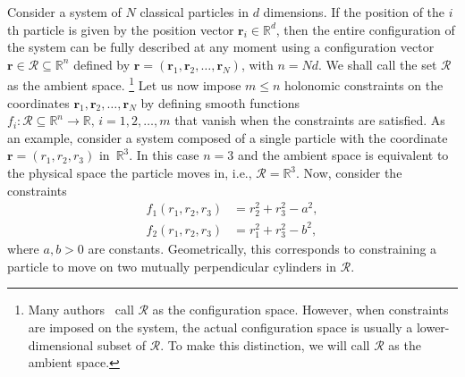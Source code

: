 Consider a system of $N$ classical particles in $d$ dimensions.  If the position of the $i$th particle is given by the position vector $\bm{r}_{i} \in \mathbb{R}^{d}$, then the entire configuration of the system can be fully described at any moment using a configuration vector $\bm{r} \in \mathscr{R} \subseteq \mathbb{R}^{n}$ defined by $\bm{r} = (\bm{r}_{1}, \bm{r}_{2}, \ldots, \bm{r}_{N})$, with $n = Nd$.
  We shall call the set $\mathscr{R}$ as the ambient space.%
  \footnote{Many authors~\cite{littlejohn1997,lelievre2010} call $\mathscr{R}$ as the configuration space.  However, when constraints are imposed on the system, the actual configuration space is usually a lower-dimensional subset of $\mathscr{R}$.  To make this distinction, we will call $\mathscr{R}$ as the ambient space.}
Let us now impose $m \leq n$ holonomic constraints on the coordinates $\bm{r}_1, \bm{r}_2, \dots, \bm{r}_N$ by defining smooth functions $f_i: \mathscr{R} \subseteq \mathbb{R}^n \to \mathbb{R},\, i=1, 2, \dots, m$ that vanish when the constraints are satisfied.
As an example, consider a system composed of a single particle with the coordinate $\bm{r} = (r_{1}, r_{2}, r_{3})$ in~$\mathbb{R}^3$.
In this case $n=3$ and the ambient space is equivalent to the physical space the particle moves in, i.e., $\mathscr{R} = \mathbb{R}^3$.
Now, consider the constraints
%
\begin{equation}
  \begin{aligned}
    f_1(r_{1}, r_{2}, r_{3}) &= r_{2}^{2} + r_{3}^{2} - a^{2},\\
    f_2(r_{1}, r_{2}, r_{3}) &= r_{1}^{2} + r_{3}^{2} - b^{2},
  \end{aligned}
  \label{eq:cylcyl}
\end{equation}
%
where $a, b > 0$ are constants.
Geometrically, this corresponds to constraining a particle to move on two mutually perpendicular cylinders in $\mathscr{R}$.

